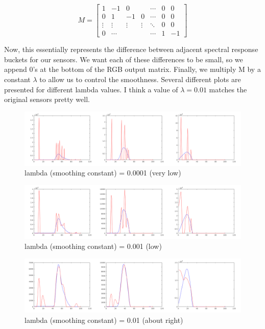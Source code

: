 \documentclass{article}
\begin{document}
$$
M = \begin{bmatrix}
1      & -1     &      0 &        & \cdots & 0 & 0 \\
0      &  1     &     -1 &      0 & \cdots & 0 & 0 \\
\vdots & \vdots & \vdots & \vdots & \ddots & 0 & 0 \\
0      & \cdots &        &        & \cdots & 1 & -1
\end{bmatrix}
$$

Now, this essentially represents the difference between adjacent spectral 
response buckets for our sensors. We want each of these differences to be small, 
so we append 0's at the bottom of the RGB output matrix. Finally, we multiply M 
by a constant $\lambda$ to allow us to control the smoothness. Several different 
plots are presented for different lambda values. I think a value of $\lambda = 0.01$ 
matches the original sensors pretty well.

\begin{figure}[!ht]
	\centering
	\includegraphics[width=160mm]{figs/sensors_smooth_lam0_0001_chanall.png}
	\caption{lambda (smoothing constant) = 0.0001 (very low)}
\end{figure}

\begin{figure}[!ht]
	\centering
	\includegraphics[width=160mm]{figs/sensors_smooth_lam0_0010_chanall.png}
	\caption{lambda (smoothing constant) = 0.001 (low)}
\end{figure}

\begin{figure}[!ht]
	\centering
	\includegraphics[width=160mm]{figs/sensors_smooth_lam0_0100_chanall.png}
	\caption{lambda (smoothing constant) = 0.01 (about right)}
\end{figure}
\end{document}
